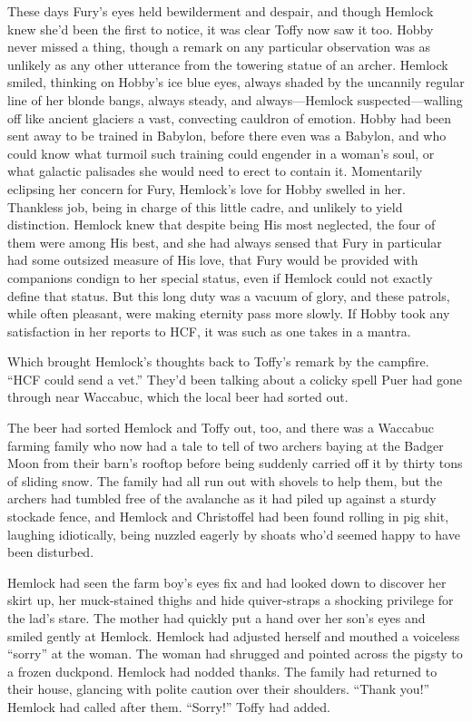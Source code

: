 \documentclass[11pt,a5paper]{article}
\begin{document}
These days Fury's eyes held bewilderment and despair, and though Hemlock knew she'd been the first to notice, it was clear Toffy now saw it too. Hobby never missed a thing, though a remark on any particular observation was as unlikely as any other utterance from the towering statue of an archer. Hemlock smiled, thinking on Hobby's ice blue eyes, always shaded by the uncannily regular line of her blonde bangs, always steady, and always---Hemlock suspected---walling off like ancient glaciers a vast, convecting cauldron of emotion. Hobby had been sent away to be trained in Babylon, before there even was a Babylon, and who could know what turmoil such training could engender in a woman's soul, or what galactic palisades she would need to erect to contain it. Momentarily eclipsing her concern for Fury, Hemlock's love for Hobby swelled in her. Thankless job, being in charge of this little cadre, and unlikely to yield distinction. Hemlock knew that despite being His most neglected, the four of them were among His best, and she had always sensed that Fury in particular had some outsized measure of His love, that Fury would be provided with companions condign to her special status, even if Hemlock could not exactly define that status. But this long duty was a vacuum of glory, and these patrols, while often pleasant, were making eternity pass more slowly. If Hobby took any satisfaction in her reports to HCF, it was such as one takes in a mantra.

Which brought Hemlock's thoughts back to Toffy's remark by the campfire. ``HCF could send a vet.'' They'd been talking about a colicky spell Puer had gone through near Waccabuc, which the local beer had sorted out.

The beer had sorted Hemlock and Toffy out, too, and there was a Waccabuc farming family who now had a tale to tell of two archers baying at the Badger Moon from their barn's rooftop before being suddenly carried off it by thirty tons of sliding snow. The family had all run out with shovels to help them, but the archers had tumbled free of the avalanche as it had piled up against a sturdy stockade fence, and Hemlock and Christoffel had been found rolling in pig shit, laughing idiotically, being nuzzled eagerly by shoats who'd seemed happy to have been disturbed.

Hemlock had seen the farm boy's eyes fix and had looked down to discover her skirt up, her muck-stained thighs and hide quiver-straps a shocking privilege for the lad's stare. The mother had quickly put a hand over her son's eyes and smiled gently at Hemlock. Hemlock had adjusted herself and mouthed a voiceless ``sorry'' at the woman. The woman had shrugged and pointed across the pigsty to a frozen duckpond. Hemlock had nodded thanks. The family had returned to their house, glancing with polite caution over their shoulders. ``Thank you!'' Hemlock had called after them. ``Sorry!'' Toffy had added.
\end{document}
